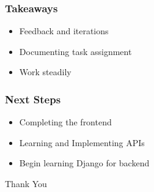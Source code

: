 \documentclass{beamer}
\begin{document}
\begin{frame}
\frametitle{Takeaways}
\begin{itemize}
  \item Feedback and iterations
  \item Documenting task assignment
  \item Work steadily
\end{itemize}
\end{frame}

\begin{frame}
\frametitle{Next Steps}
\begin{itemize}
  \item Completing the frontend
  \item Learning and Implementing APIs
  \item Begin learning Django for backend
\end{itemize}
\end{frame}

\begin{frame}
  \center\Huge Thank You
\end{frame}
\end{document}
